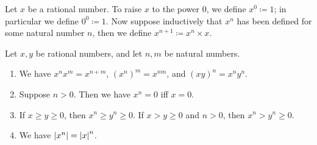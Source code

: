 \begin{defn}\label{i:4.3.9}
  Let \(x\) be a rational number.
  To raise \(x\) to the power \(0\), we define \(x^0 \coloneqq 1\);
  in particular we define \(0^0 \coloneqq 1\).
  Now suppose inductively that \(x^n\) has been defined for some natural number \(n\), then we define \(x^{n+1} \coloneqq x^n \times x\).
\end{defn}

\begin{prop}\label{i:4.3.10}
  Let \(x, y\) be rational numbers, and let \(n, m\) be natural numbers.
  \begin{enumerate}
    \item We have \(x^n x^m = x^{n + m}\), \((x^n)^m = x^{nm}\), and \((xy)^n = x^n y^n\).
    \item Suppose \(n > 0\).
          Then we have \(x^n = 0\) iff \(x = 0\).
    \item If \(x \geq y \geq 0\), then \(x^n \geq y^n \geq 0\).
          If \(x > y \geq 0\) and \(n > 0\), then \(x^n > y^n \geq 0\).
    \item We have \(\left\lvert x^n\right\rvert = \left\lvert x\right\rvert^n\).
  \end{enumerate}
\end{prop}


